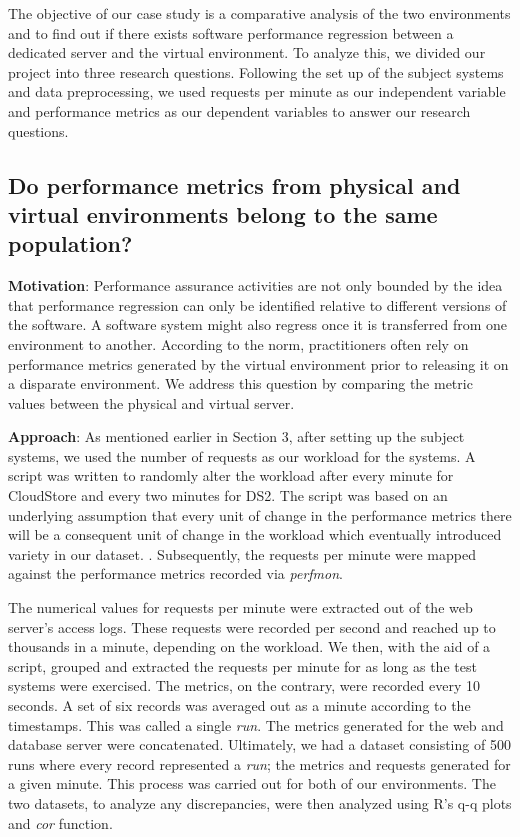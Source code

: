 The objective of our case study is a comparative analysis of the two environments and to find out if there exists software performance regression between a dedicated server and the virtual environment. To analyze this, we divided our project into three research questions. Following the set up of the subject systems and data preprocessing, we used requests per minute as our independent variable and performance metrics as our dependent variables to answer our research questions. %

\subsection{\textbf{Do performance metrics from physical and virtual environments belong to the same population?}}

\textbf{Motivation}: Performance assurance activities are not only bounded by the idea that performance regression can only be identified relative to different versions of the software. A software system might also regress once it is transferred from one environment to another. According to the norm, practitioners often rely on performance metrics generated by the virtual environment prior to releasing it on a disparate environment. We address this question by comparing the metric values between the physical and virtual server. 

\textbf{Approach}: As mentioned earlier in Section 3, after setting up the subject systems, we used the number of requests as our workload for the systems. A script was written to randomly alter the workload after every minute for CloudStore and every two minutes for DS2. The script was based on an underlying assumption that every unit of change in the performance metrics there will be a consequent unit of change in the workload which eventually introduced variety in our dataset. \cite{linearregression}. Subsequently, the requests per minute were mapped against the performance metrics recorded via \textit{perfmon}.

The numerical values for requests per minute were extracted out of the web server's access logs. These requests were recorded per second and reached up to thousands in a minute, depending on the workload. We then, with the aid of a script, grouped and extracted the requests per minute for as long as the test systems were exercised. The metrics, on the contrary, were recorded every 10 seconds. A set of six records was averaged out as a minute according to the timestamps. This was called a single \textit{run}. The metrics generated for the web and database server were concatenated. Ultimately, we had a dataset consisting of 500 runs where every record represented a \textit{run}; the metrics and requests generated for a given minute. This process was carried out for both of our environments. The two datasets, to analyze any discrepancies, were then analyzed using R's q-q plots and \textit{cor} function.




